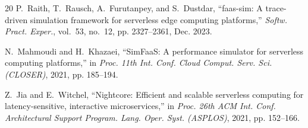 \documentclass[conference]{IEEEtran}
\begin{document}
\begin{thebibliography}{20}
P.~Raith, T.~Rausch, A.~Furutanpey, and S.~Dustdar, ``faas-sim: A trace-driven simulation framework for serverless edge computing platforms,'' \emph{Softw. Pract. Exper.}, vol.~53, no.~12, pp. 2327--2361, Dec. 2023.

N.~Mahmoudi and H.~Khazaei, ``SimFaaS: A performance simulator for serverless computing platforms,'' in \emph{Proc. 11th Int. Conf. Cloud Comput. Serv. Sci. (CLOSER)}, 2021, pp. 185--194.

Z.~Jia and E.~Witchel, ``Nightcore: Efficient and scalable serverless computing for latency-sensitive, interactive microservices,'' in \emph{Proc. 26th ACM Int. Conf. Architectural Support Program. Lang. Oper. Syst. (ASPLOS)}, 2021, pp. 152--166.

\end{thebibliography}
\end{document}

